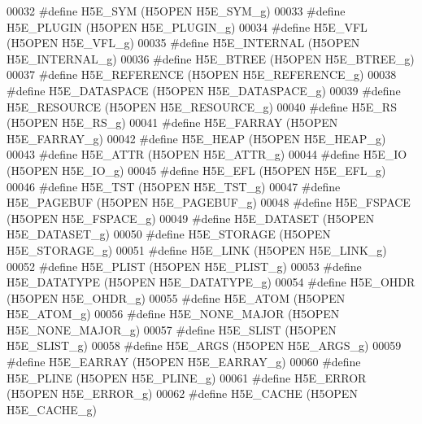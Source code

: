 \begin{DoxyCode}
00032 \textcolor{preprocessor}{#define H5E\_SYM              (H5OPEN H5E\_SYM\_g)}
00033 \textcolor{preprocessor}{#define H5E\_PLUGIN           (H5OPEN H5E\_PLUGIN\_g)}
00034 \textcolor{preprocessor}{#define H5E\_VFL              (H5OPEN H5E\_VFL\_g)}
00035 \textcolor{preprocessor}{#define H5E\_INTERNAL         (H5OPEN H5E\_INTERNAL\_g)}
00036 \textcolor{preprocessor}{#define H5E\_BTREE            (H5OPEN H5E\_BTREE\_g)}
00037 \textcolor{preprocessor}{#define H5E\_REFERENCE        (H5OPEN H5E\_REFERENCE\_g)}
00038 \textcolor{preprocessor}{#define H5E\_DATASPACE        (H5OPEN H5E\_DATASPACE\_g)}
00039 \textcolor{preprocessor}{#define H5E\_RESOURCE         (H5OPEN H5E\_RESOURCE\_g)}
00040 \textcolor{preprocessor}{#define H5E\_RS               (H5OPEN H5E\_RS\_g)}
00041 \textcolor{preprocessor}{#define H5E\_FARRAY           (H5OPEN H5E\_FARRAY\_g)}
00042 \textcolor{preprocessor}{#define H5E\_HEAP             (H5OPEN H5E\_HEAP\_g)}
00043 \textcolor{preprocessor}{#define H5E\_ATTR             (H5OPEN H5E\_ATTR\_g)}
00044 \textcolor{preprocessor}{#define H5E\_IO               (H5OPEN H5E\_IO\_g)}
00045 \textcolor{preprocessor}{#define H5E\_EFL              (H5OPEN H5E\_EFL\_g)}
00046 \textcolor{preprocessor}{#define H5E\_TST              (H5OPEN H5E\_TST\_g)}
00047 \textcolor{preprocessor}{#define H5E\_PAGEBUF          (H5OPEN H5E\_PAGEBUF\_g)}
00048 \textcolor{preprocessor}{#define H5E\_FSPACE           (H5OPEN H5E\_FSPACE\_g)}
00049 \textcolor{preprocessor}{#define H5E\_DATASET          (H5OPEN H5E\_DATASET\_g)}
00050 \textcolor{preprocessor}{#define H5E\_STORAGE          (H5OPEN H5E\_STORAGE\_g)}
00051 \textcolor{preprocessor}{#define H5E\_LINK             (H5OPEN H5E\_LINK\_g)}
00052 \textcolor{preprocessor}{#define H5E\_PLIST            (H5OPEN H5E\_PLIST\_g)}
00053 \textcolor{preprocessor}{#define H5E\_DATATYPE         (H5OPEN H5E\_DATATYPE\_g)}
00054 \textcolor{preprocessor}{#define H5E\_OHDR             (H5OPEN H5E\_OHDR\_g)}
00055 \textcolor{preprocessor}{#define H5E\_ATOM             (H5OPEN H5E\_ATOM\_g)}
00056 \textcolor{preprocessor}{#define H5E\_NONE\_MAJOR       (H5OPEN H5E\_NONE\_MAJOR\_g)}
00057 \textcolor{preprocessor}{#define H5E\_SLIST            (H5OPEN H5E\_SLIST\_g)}
00058 \textcolor{preprocessor}{#define H5E\_ARGS             (H5OPEN H5E\_ARGS\_g)}
00059 \textcolor{preprocessor}{#define H5E\_EARRAY           (H5OPEN H5E\_EARRAY\_g)}
00060 \textcolor{preprocessor}{#define H5E\_PLINE            (H5OPEN H5E\_PLINE\_g)}
00061 \textcolor{preprocessor}{#define H5E\_ERROR            (H5OPEN H5E\_ERROR\_g)}
00062 \textcolor{preprocessor}{#define H5E\_CACHE            (H5OPEN H5E\_CACHE\_g)}

\end{DoxyCode}
